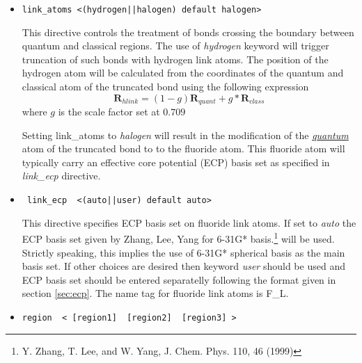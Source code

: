 \begin{itemize}
\item
\begin{verbatim}
link_atoms <(hydrogen||halogen) default halogen>
\end{verbatim}

This directive controls the treatment of bonds crossing the boundary between quantum and classical regions.
The use of {\it hydrogen } keyword will trigger truncation of such bonds with hydrogen link atoms. The position of the hydrogen
atom will be calculated from the coordinates of the quantum and classical atom of the truncated bond using the
following expression
\begin{displaymath}
\mathbf{R}_{hlink} = (1-g)\mathbf{R}_{quant} + g*\mathbf{R}_{class}
\end{displaymath}
where $g$ is the scale factor set at $0.709$

Setting link{\_}atoms to {\it halogen } will result in the modification of the {\it \underline{quantum}} 
atom of the truncated bond to 
to the fluoride atom. This fluoride atom will typically carry an effective core potential (ECP) basis set as specified
in {\it link{\_}ecp} directive.

\item
\begin{verbatim}
 link_ecp  <(auto||user) default auto> 
\end{verbatim}
This directive specifies ECP basis set on fluoride link atoms. If set to {\it auto } 
the ECP basis set given by Zhang, Lee, Yang for 6-31G* basis.\footnote{Y. Zhang, T. Lee, and W. Yang, J. Chem. Phys. 110, 46 (1999)} 
will be used. Strictly speaking, this implies the use of 6-31G* spherical basis as the main basis set. 
If other choices are desired then keyword {\it user } should be used and ECP basis set should be entered separatelly 
following the format given in
section \ref{sec:ecp}. 
The name tag for fluoride link atoms is F{\_}L. 

\item
\begin{verbatim}
region  < [region1]  [region2]  [region3] >
\end{verbatim}


\end{itemize}
